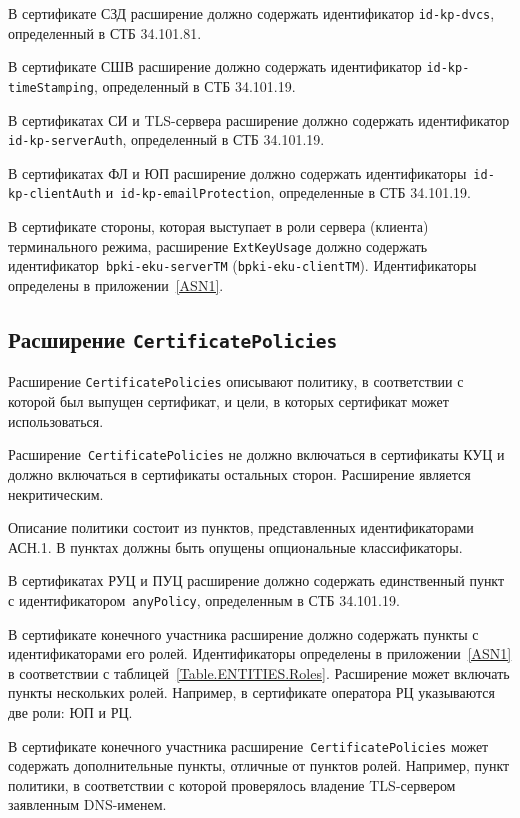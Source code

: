 В сертификате СЗД расширение должно содержать
идентификатор \verb|id-kp-dvcs|, определенный в СТБ 34.101.81.

В сертификате СШВ расширение должно содержать
идентификатор \verb|id-kp-timeStamping|, определенный в СТБ 34.101.19.

В сертификатах СИ и TLS-сервера расширение должно содержать
идентификатор \verb|id-kp-serverAuth|, определенный в СТБ 34.101.19.

В сертификатах ФЛ и ЮП расширение должно содержать
идентификаторы~\verb|id-kp-clientAuth| и~\verb|id-kp-emailProtection|, 
определенные в СТБ 34.101.19.

В сертификате стороны, которая выступает в роли сервера (клиента)
терминального режима, расширение \texttt{ExtKeyUsage} должно содержать
идентификатор~\texttt{bpki-eku-serverTM} (\texttt{bpki-eku-clientTM}). 
Идентификаторы определены в приложении~\ref{ASN1}.

\subsection{Расширение \texttt{CertificatePolicies}}\label{FMT.Ext.CP}

Расширение \texttt{CertificatePolicies} описывают политику, в соответствии 
с которой был выпущен сертификат, и цели, в которых сертификат может 
использоваться. 

Расширение~\texttt{CertificatePolicies} не должно включаться в сертификаты
КУЦ и должно включаться в сертификаты остальных сторон. 
Расширение является некритическим.

Описание политики состоит из пунктов, представленных идентификаторами 
АСН.1. В пунктах должны быть опущены опциональные классификаторы. 

В сертификатах РУЦ и ПУЦ расширение должно содержать единственный пункт
с идентификатором~\texttt{anyPolicy}, определенным в СТБ 34.101.19.

В сертификате конечного участника расширение 
должно содержать пункты с идентификаторами его ролей.
Идентификаторы определены в приложении~\ref{ASN1}
в соответствии с таблицей~\ref{Table.ENTITIES.Roles}. 
Расширение может включать пункты нескольких ролей.
Например, в сертификате оператора РЦ указываются две роли: ЮП и РЦ.

В сертификате конечного участника расширение~\texttt{CertificatePolicies} 
может содержать дополнительные пункты, отличные от пунктов 
ролей. Например, пункт политики, в соответствии с которой 
проверялось владение TLS-сервером заявленным DNS-именем.

